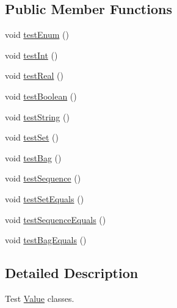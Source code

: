 \subsection*{Public Member Functions}
\begin{DoxyCompactItemize}
\item 
void \hyperlink{classorg_1_1tzi_1_1use_1_1uml_1_1ocl_1_1value_1_1_value_test_a4dda7cfdc7c18a6c44c037aa05e695bd}{test\-Enum} ()
\item 
void \hyperlink{classorg_1_1tzi_1_1use_1_1uml_1_1ocl_1_1value_1_1_value_test_aad044c7d95420a3ee550799f1a85b87e}{test\-Int} ()
\item 
void \hyperlink{classorg_1_1tzi_1_1use_1_1uml_1_1ocl_1_1value_1_1_value_test_ace815543f9f63992fd9b4065d0584d9f}{test\-Real} ()
\item 
void \hyperlink{classorg_1_1tzi_1_1use_1_1uml_1_1ocl_1_1value_1_1_value_test_a896949e92eb36f2bf4dd70bc4d9ac842}{test\-Boolean} ()
\item 
void \hyperlink{classorg_1_1tzi_1_1use_1_1uml_1_1ocl_1_1value_1_1_value_test_a1f70c44885c4d05d2bdda26dc42f227d}{test\-String} ()
\item 
void \hyperlink{classorg_1_1tzi_1_1use_1_1uml_1_1ocl_1_1value_1_1_value_test_ae73745d551b9a84e786ec8fd0ac53a2b}{test\-Set} ()
\item 
void \hyperlink{classorg_1_1tzi_1_1use_1_1uml_1_1ocl_1_1value_1_1_value_test_a136da40cc2a83173a65a868780cf0890}{test\-Bag} ()
\item 
void \hyperlink{classorg_1_1tzi_1_1use_1_1uml_1_1ocl_1_1value_1_1_value_test_a1d25a07cc8c561ddd2d587fc7f3145dd}{test\-Sequence} ()
\item 
void \hyperlink{classorg_1_1tzi_1_1use_1_1uml_1_1ocl_1_1value_1_1_value_test_acc63bcae68910db024f8cfabfee3ebab}{test\-Set\-Equals} ()
\item 
void \hyperlink{classorg_1_1tzi_1_1use_1_1uml_1_1ocl_1_1value_1_1_value_test_a014625fe28ac9e6665082465661929b6}{test\-Sequence\-Equals} ()
\item 
void \hyperlink{classorg_1_1tzi_1_1use_1_1uml_1_1ocl_1_1value_1_1_value_test_a1ef4aa3739896ac82808379275738b6c}{test\-Bag\-Equals} ()
\end{DoxyCompactItemize}


\subsection{Detailed Description}
Test \hyperlink{classorg_1_1tzi_1_1use_1_1uml_1_1ocl_1_1value_1_1_value}{Value} classes.


